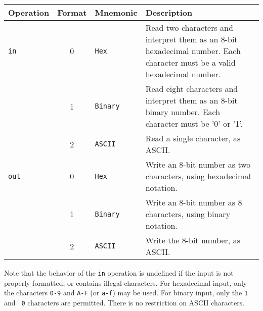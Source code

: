 
\vspace{3mm}
\noindent
\begin{tabular}{|l||c|l|p{3.75in}|}
\hline
{\bf Operation}   & {\bf Format}    & {\bf Mnemonic} & {\bf Description} \\
\hline
\hline
{\tt in}	& 0     & {\tt Hex}	& Read two characters and interpret
				them as an 8-bit hexadecimal number.
				Each character must be a valid hexadecimal
				number.  \\
		& 1     & {\tt Binary}	& Read eight characters and interpret
				them as an 8-bit binary number.
				Each character must be '0' or '1'. \\
		& 2	& {\tt ASCII}	& Read a single character, as ASCII. \\
\hline
{\tt out}	& 0     & {\tt Hex}	& Write an 8-bit number as two
				characters, using hexadecimal notation.  \\
		& 1     & {\tt Binary}	& Write an 8-bit number as 8
				characters, using binary notation. \\
		& 2	& {\tt ASCII}	& Write the 8-bit number, as ASCII. \\
\hline
\end{tabular}

\vspace{3mm}

Note that the behavior of the {\tt in} operation is undefined if the
input is not properly formatted, or contains illegal characters.  For
hexadecimal input, only the characters {\tt 0-9} and {\tt A-F} (or
{\tt a-f}) may be used.  For binary input, only the {\tt 1} and {\tt
0} characters are permitted.  There is no restriction on {\sc ASCII}
characters.

\vspace{3mm}


